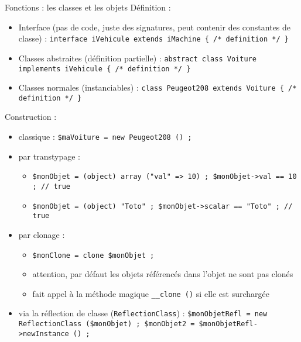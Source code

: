 \begin{frame}[containsverbatim]{Fonctions : les classes et les objets}
	Définition :
	\begin{itemize}
		\item Interface (pas de code, juste des signatures, peut contenir des constantes de classe) : \lstinline~interface iVehicule extends iMachine { /* definition */ }~
		\item Classes abstraites (définition partielle) : \lstinline~abstract class Voiture implements iVehicule { /* definition */ }~
		\item Classes normales (instanciables) : \lstinline~class Peugeot208 extends Voiture { /* definition */ }~
	\end{itemize}
	Construction :
	\begin{itemize}
		\item classique : \lstinline~$maVoiture = new Peugeot208 () ;~
		\item par transtypage : 
		\begin{itemize}
			\item \lstinline~$monObjet = (object) array ("val" => 10) ; $monObjet->val == 10 ; // true~
			\item \lstinline~$monObjet = (object) "Toto" ; $monObjet->scalar == "Toto" ; // true~
		\end{itemize}
		\item par clonage :
		\begin{itemize}
			\item \lstinline~$monClone = clone $monObjet ;~ 
			\item attention, par défaut les objets référencés dans l’objet ne sont pas clonés
			\item fait appel à la méthode magique \texttt{\_\_clone ()} si elle est surchargée
		\end{itemize}
		\item via la réflection de classe (\texttt{ReflectionClass}) : \lstinline~$monObjetRefl = new ReflectionClass ($monObjet) ; $monObjet2 = $monObjetRefl->newInstance () ;~
	\end{itemize}
\end{frame}
 
